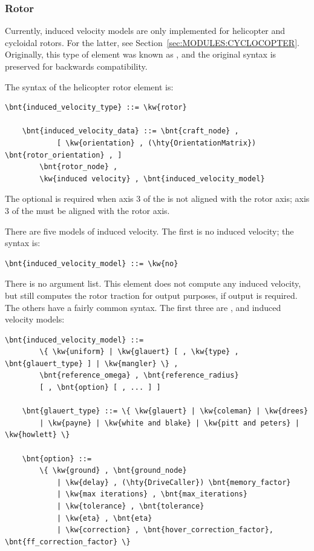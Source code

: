 \subsubsection{Rotor}
\label{sec:EL:AERO:INDVEL:ROTOR}
Currently, induced velocity models are only implemented
for helicopter and cycloidal rotors.
For the latter, see Section~\ref{sec:MODULES:CYCLOCOPTER}.
Originally, this type of element was known as ,
and the original syntax is preserved for backwards compatibility.

The syntax of the helicopter rotor  element is:
\begin{Verbatim}[commandchars=\\\{\}]
    \bnt{induced_velocity_type} ::= \kw{rotor}

    \bnt{induced_velocity_data} ::= \bnt{craft_node} ,
            [ \kw{orientation} , (\hty{OrientationMatrix}) \bnt{rotor_orientation} , ]
        \bnt{rotor_node} ,
        \kw{induced velocity} , \bnt{induced_velocity_model}
\end{Verbatim}
The optional  is required when axis 3
of the  is not aligned with the rotor axis; axis 3
of the  must be aligned with the rotor axis.

There are five models of induced velocity.
The first is no induced velocity; the syntax is:
\begin{Verbatim}[commandchars=\\\{\}]
    \bnt{induced_velocity_model} ::= \kw{no}
\end{Verbatim}
There is no argument list. This element does not compute any induced
velocity, but still computes the rotor traction for output purposes,
if output is required.
The others have a fairly common syntax.  The first three are
,  and  induced velocity
models:
\begin{Verbatim}[commandchars=\\\{\}]
    \bnt{induced_velocity_model} ::=
        \{ \kw{uniform} | \kw{glauert} [ , \kw{type} , \bnt{glauert_type} ] | \kw{mangler} \} ,
        \bnt{reference_omega} , \bnt{reference_radius}
        [ , \bnt{option} [ , ... ] ]

    \bnt{glauert_type} ::= \{ \kw{glauert} | \kw{coleman} | \kw{drees}
        | \kw{payne} | \kw{white and blake} | \kw{pitt and peters} | \kw{howlett} \}

    \bnt{option} ::=
        \{ \kw{ground} , \bnt{ground_node}
            | \kw{delay} , (\hty{DriveCaller}) \bnt{memory_factor}
            | \kw{max iterations} , \bnt{max_iterations}
            | \kw{tolerance} , \bnt{tolerance}
            | \kw{eta} , \bnt{eta}
            | \kw{correction} , \bnt{hover_correction_factor}, \bnt{ff_correction_factor} \}
\end{Verbatim}

